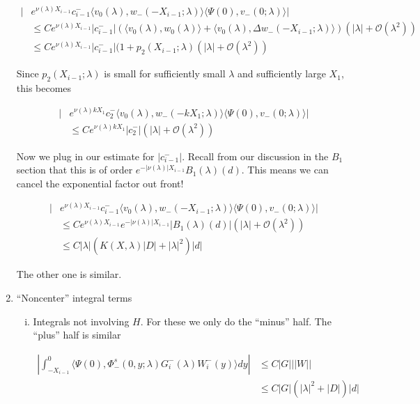 \documentclass[12pt]{article}
\begin{document}
\begin{enumerate}
\begin{align*}
|&e^{\nu(\lambda)X_{i-1}} c_{i-1}^- \langle v_0(\lambda), w_-(-X_{i-1}; \lambda) \rangle \langle \Psi(0), v_-(0; \lambda) \rangle| \\
&\leq C e^{\nu(\lambda)X_{i-1}}|c_{i-1}^-| (\langle v_0(\lambda), w_0(\lambda) \rangle + \langle v_0(\lambda), \Delta w_-(-X_{i-1}; \lambda) \rangle) (|\lambda| + \mathcal{O}(\lambda^2) ) \\
&\leq C e^{\nu(\lambda)X_{i-1}}|c_{i-1}^-| (1 + p_2(X_{i-1}; \lambda) (|\lambda| + \mathcal{O}(\lambda^2) )
\end{align*}

Since $p_2(X_{i-1}; \lambda)$ is small for sufficiently small $\lambda$ and sufficiently large $X_1$, this becomes

\begin{align*}
|&e^{\nu(\lambda)k X_1} c_2^- \langle v_0(\lambda), w_-(-k X_1; \lambda) \rangle \langle \Psi(0), v_-(0; \lambda) \rangle| \\
&\leq C e^{\nu(\lambda)k X_1}|c_2^-| (|\lambda| + \mathcal{O}(\lambda^2) )
\end{align*}

Now we plug in our estimate for $|c_{i-1}^-|$. Recall from our discussion in the $B_1$ section that this is of order $e^{-|\nu(\lambda)|X_{i-1}} B_1(\lambda)(d)$. This means we can cancel the exponential factor out front! 

\begin{align*}
|&e^{\nu(\lambda)X_{i-1}} c_{i-1}^- \langle v_0(\lambda), w_-(-X_{i-1}; \lambda) \rangle \langle \Psi(0), v_-(0; \lambda) \rangle| \\
&\leq C e^{\nu(\lambda)X_{i-1}} e^{-|\nu(\lambda)|X_{i-1}} |B_1(\lambda)(d)| (|\lambda| + \mathcal{O}(\lambda^2) ) \\
&\leq C |\lambda| ( K(X, \lambda) |D|+ |\lambda|^2 )|d|
\end{align*}

The other one is similar.\\

\item ``Noncenter'' integral terms

\begin{enumerate}[(i)]

\item Integrals not involving $H$. For these we only do the ``minus'' half. The ``plus'' half is similar

\begin{align*}
\left| \int_{-X_{i-1}}^0 \langle \Psi(0), \Phi^s_-(0, y; \lambda) G_i^-(\lambda)W_i^-(y) \rangle dy \right| 
&\leq C |G| ||W|| \\
&\leq C |G| ( |\lambda|^2 + |D|)|d|
\end{align*}


\end{enumerate}
\end{enumerate}
\end{document}
